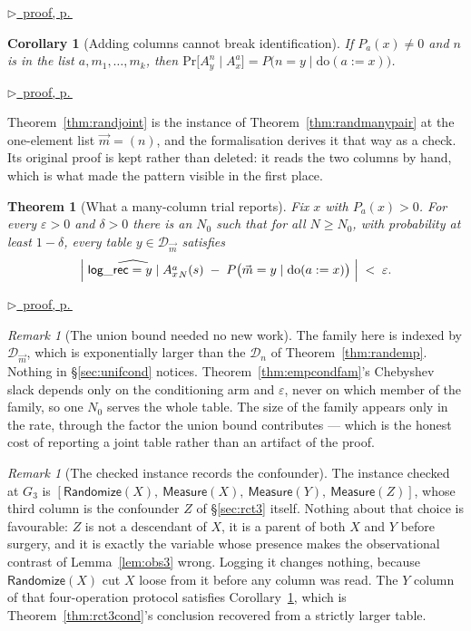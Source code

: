 \documentclass[11pt,a4paper]{article}
\theoremstyle{definition}
\theoremstyle{plain}
\newtheorem{theorem}[definition]{Theorem}
\newtheorem{corollary}[definition]{Corollary}
\theoremstyle{remark}
\newtheorem{remark}[definition]{Remark}
\newcommand{\dom}{\mathcal{D}}
\newcommand{\emp}[1]{\widehat{#1}}
\renewcommand{\Pr}{\mathrm{Pr}}
\newcommand{\pfref}[1]{%
  \par\smallskip\noindent
  \hyperref[pf:#1]{\small$\triangleright$\ proof, p.\,\pageref{pf:#1}}\par\smallskip}
\begin{document}
\pfref{thm:randmanypair}

\begin{corollary}[Adding columns cannot break identification]
\label{cor:randmanycol}
If $P_a(x) \neq 0$ and $n$ is in the list $a,m_1,\dots,m_k$, then
$\Pr\bigl[A^{n}_y \mid A^{a}_x\bigr]
 = P\bigl(n = y \mid \mathrm{do}(a := x)\bigr)$.
\end{corollary}

\pfref{cor:randmanycol}

Theorem~\ref{thm:randjoint} is the instance of
Theorem~\ref{thm:randmanypair} at the one-element list $\vec m = (n)$, and
the formalisation derives it that way as a check. Its original proof is
kept rather than deleted: it reads the two columns by hand, which is what
made the pattern visible in the first place.

\begin{theorem}[What a many-column trial reports]
\label{thm:randmanyemp}
Fix $x$ with $P_a(x) > 0$. For every $\varepsilon > 0$ and $\delta > 0$
there is an $N_0$ such that for all $N \ge N_0$, with probability at least
$1 - \delta$, \emph{every} table $y \in \dom_{\vec m}$ satisfies
\[
  \Bigl|\;\emp{\mathsf{log\_rec} = y \mid A^{a}_x}_N(s)
  \;-\; P\bigl(\vec m = y \mid \mathrm{do}(a := x)\bigr)\;\Bigr|
  \;<\; \varepsilon .
\]
\end{theorem}

\pfref{thm:randmanyemp}

\begin{remark}[The union bound needed no new work]
\label{rem:unifcols}
The family here is indexed by $\dom_{\vec m}$, which is exponentially
larger than the $\dom_n$ of Theorem~\ref{thm:randemp}. Nothing in
\S\ref{sec:unifcond} notices. Theorem~\ref{thm:empcondfam}'s Chebyshev
slack depends only on the conditioning arm and $\varepsilon$, never on
which member of the family, so one $N_0$ serves the whole table. The size
of the family appears only in the rate, through the factor the union bound
contributes --- which is the honest cost of reporting a joint table rather
than an artifact of the proof.
\end{remark}

\begin{remark}[The checked instance records the confounder]
\label{rem:covinstance}
The instance checked at $G_3$ is
$[\mathsf{Randomize}(X),\ \mathsf{Measure}(X),\ \mathsf{Measure}(Y),\
\mathsf{Measure}(Z)]$, whose third column is the confounder $Z$ of
\S\ref{sec:rct3} itself. Nothing about that choice is favourable: $Z$ is
not a descendant of $X$, it is a parent of both $X$ and $Y$ before
surgery, and it is exactly the variable whose presence makes the
observational contrast of Lemma~\ref{lem:obs3} wrong. Logging it changes
nothing, because $\mathsf{Randomize}(X)$ cut $X$ loose from it before any
column was read. The $Y$ column of that four-operation protocol satisfies
Corollary~\ref{cor:randmanycol}, which is Theorem~\ref{thm:rct3cond}'s
conclusion recovered from a strictly larger table.
\end{remark}
\end{document}

